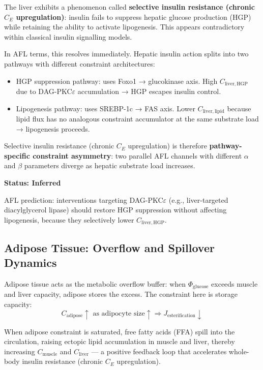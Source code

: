 \documentclass[11pt]{article}
\begin{document}
The liver exhibits a phenomenon called \textbf{selective insulin resistance (chronic $C_E$ upregulation)}: insulin fails to suppress hepatic glucose production (HGP) while retaining the ability to activate lipogenesis. This appears contradictory within classical insulin signalling models.

In AFL terms, this resolves immediately. Hepatic insulin action splits into two pathways with different constraint architectures:

\begin{itemize}
    \item HGP suppression pathway: uses Foxo1 → glucokinase axis. High $C_{\mathrm{liver,HGP}}$ due to DAG-PKC$\varepsilon$ accumulation → HGP escapes insulin control.
    \item Lipogenesis pathway: uses SREBP-1c → FAS axis. Lower $C_{\mathrm{liver,lipid}}$ because lipid flux has no analogous constraint accumulator at the same substrate load → lipogenesis proceeds.
\end{itemize}

Selective insulin resistance (chronic $C_E$ upregulation) is therefore \textbf{pathway-specific constraint asymmetry}: two parallel AFL channels with different $\alpha$ and $\beta$ parameters diverge as hepatic substrate load increases.

\textbf{Status: Inferred}

AFL prediction: interventions targeting DAG-PKC$\varepsilon$ (e.g., liver-targeted diacylglycerol lipase) should restore HGP suppression without affecting lipogenesis, because they selectively lower $C_{\mathrm{liver,HGP}}$.

\subsection{Adipose Tissue: Overflow and Spillover Dynamics}

Adipose tissue acts as the metabolic overflow buffer: when $\Phi_{\mathrm{glucose}}$ exceeds muscle and liver capacity, adipose stores the excess. The constraint here is storage capacity:
\begin{equation}
    C_{\mathrm{adipose}} \uparrow \text{ as adipocyte size} \uparrow \Rightarrow J_{\mathrm{esterification}} \downarrow
\end{equation}

When adipose constraint is saturated, free fatty acids (FFA) spill into the circulation, raising ectopic lipid accumulation in muscle and liver, thereby increasing $C_{\mathrm{muscle}}$ and $C_{\mathrm{liver}}$ --- a positive feedback loop that accelerates whole-body insulin resistance (chronic $C_E$ upregulation).
\end{document}
